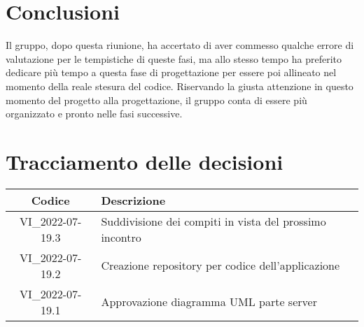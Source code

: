 \section{Conclusioni}
Il gruppo, dopo questa riunione, ha accertato di aver commesso qualche errore di valutazione per le tempistiche di queste fasi, 
ma allo stesso tempo ha preferito dedicare più tempo a questa fase di progettazione per essere poi allineato nel momento della reale stesura del codice. 
Riservando la giusta attenzione in questo momento del progetto alla progettazione, il gruppo conta di essere più organizzato e pronto nelle fasi successive.
\newpage

\section*{Tracciamento delle decisioni}
	\renewcommand{\arraystretch}{1.8} %
	\begin{tabular}{ |c|l| }
		\hline
		\textbf{Codice} & \textbf{Descrizione} \\
		\hline
		VI\_2022-07-19.3 & Suddivisione dei compiti in vista del prossimo incontro \\
    \hline
		VI\_2022-07-19.2 & Creazione repository per codice dell'applicazione \\
    \hline
		VI\_2022-07-19.1 & Approvazione diagramma UML parte server \\
		\hline
	\end{tabular}